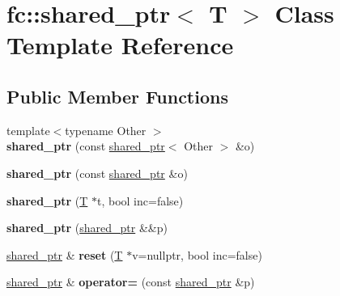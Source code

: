 \hypertarget{classfc_1_1shared__ptr}{}\section{fc\+:\+:shared\+\_\+ptr$<$ T $>$ Class Template Reference}
\label{classfc_1_1shared__ptr}
\subsection*{Public Member Functions}
\begin{DoxyCompactItemize}
\item 
\mbox{\label{classfc_1_1shared__ptr_abb2da84875955b887f9a709b8a077f0b}} 
{\footnotesize template$<$typename Other $>$ }\\{\bfseries shared\+\_\+ptr} (const \mbox{\hyperlink{classfc_1_1shared__ptr}{shared\+\_\+ptr}}$<$ Other $>$ \&o)
\item 
\mbox{\label{classfc_1_1shared__ptr_a54ec85747d7c39c28181397379562a37}} 
{\bfseries shared\+\_\+ptr} (const \mbox{\hyperlink{classfc_1_1shared__ptr}{shared\+\_\+ptr}} \&o)
\item 
\mbox{\label{classfc_1_1shared__ptr_a9acdaf4f45060ea034e1bc5934df4351}} 
{\bfseries shared\+\_\+ptr} (\mbox{\hyperlink{struct_t}{T}} $\ast$t, bool inc=false)
\item 
\mbox{\label{classfc_1_1shared__ptr_af0d111913df12890835a7039992a52f3}} 
{\bfseries shared\+\_\+ptr} (\mbox{\hyperlink{classfc_1_1shared__ptr}{shared\+\_\+ptr}} \&\&p)
\item 
\mbox{\label{classfc_1_1shared__ptr_a149a84c974b64991e30ed0c13f627667}} 
\mbox{\hyperlink{classfc_1_1shared__ptr}{shared\+\_\+ptr}} \& {\bfseries reset} (\mbox{\hyperlink{struct_t}{T}} $\ast$v=nullptr, bool inc=false)
\item 
\mbox{\label{classfc_1_1shared__ptr_a57d42a1853ed0c373f137ef6ed4c8492}} 
\mbox{\hyperlink{classfc_1_1shared__ptr}{shared\+\_\+ptr}} \& {\bfseries operator=} (const \mbox{\hyperlink{classfc_1_1shared__ptr}{shared\+\_\+ptr}} \&p)
\item 
\mbox{\label{classfc_1_1shared__ptr_a71a5912223b108cc66d6f07914f1f90a}} 

\end{DoxyCompactItemize}
